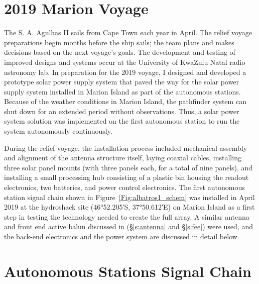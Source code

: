 \section{2019 Marion Voyage}

The S. A. Agulhas II sails from Cape Town each year in April. The relief voyage preparations begin months before the ship sails; the team plans and makes decisions based on the next voyage's goals. The development and testing of improved designs and systems occur at the University of KwaZulu Natal radio astronomy lab. In preparation for the 2019 voyage, I designed and developed a prototype solar power supply system that paved the way for the solar power supply system installed in Marion Island as part of the autonomous stations. Because of the weather conditions in Marion Island, the pathfinder system can shut down for an extended period without observations. Thus, a solar power system solution was implemented on the first autonomous station to run the system autonomously continuously. 

During the relief voyage, the installation process included mechanical assembly and alignment of the antenna structure itself, laying coaxial cables, installing three solar panel mounts (with three panels each, for a total of nine panels), and installing a small processing hub consisting of a plastic bin housing the readout electronics, two batteries, and power control electronics. The first autonomous station signal chain shown in Figure~\ref{Fig:albatros1_schem} was installed in April 2019 at the hydroshack site (\ang{46;52.205;}S, \ang{37;50.612;}E) on Marion Island as a first step in testing the technology needed to create the full array. A similar antenna and front end active balun discussed in (\S\ref{s:antenna} and \S\ref{s:fee}) were used, and the back-end electronics and the power system are discussed in detail below.

\section{Autonomous Stations Signal Chain}

